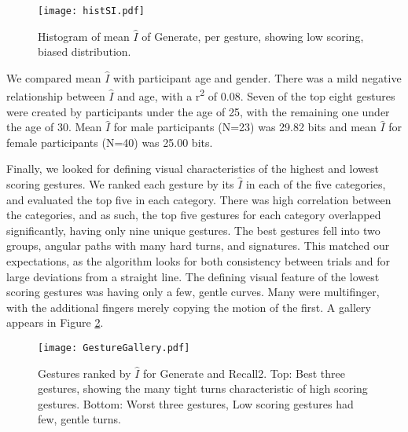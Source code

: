 \documentclass{sig-alternate-10pt}
\begin{document}
  \begin{figure}[!h]
  \centering
  \texttt{[image: histSI.pdf]}
\caption{Histogram of mean  $\hat{I}$ of Generate, per gesture, showing low scoring, biased distribution.}
  \label{fig:histSI}
  \end{figure}
  










We compared mean $\hat{I}$ with participant age and gender. There was a mild negative relationship between $\hat{I}$ and age, with a r\textsuperscript{2} of 0.08. Seven of the top eight gestures were created by participants under the age of 25, with the remaining one under the age of 30. Mean $\hat{I}$ for male participants (N=23) was 29.82 bits and mean $\hat{I}$ for female participants (N=40) was 25.00 bits.






  












Finally, we looked for defining visual characteristics of the highest and lowest scoring gestures. We ranked each gesture by its $\hat{I}$ in each of the five categories, and evaluated the top five in each category. There was high correlation between the categories, and as such, the top five gestures for each category overlapped significantly, having only nine unique gestures. The best gestures fell into two groups, angular paths with many hard turns, and signatures. This matched our expectations, as the algorithm looks for both consistency between trials and for large deviations from a straight line. The defining visual feature of the lowest scoring gestures was having only a few, gentle curves. Many were multifinger, with the additional fingers merely copying the motion of the first.  A gallery  appears in Figure \ref{fig:gallerysummary}.

\begin{figure}[!h]
\begin{center}
\texttt{[image: GestureGallery.pdf]}
\caption{Gestures ranked by $\hat{I}$ for Generate and Recall2. Top: Best three gestures, showing the many tight turns characteristic of high scoring gestures. Bottom: Worst three gestures, Low scoring gestures had few, gentle turns.}
\label{fig:gallerysummary}
\end{center}
\end{figure}
\end{document}
